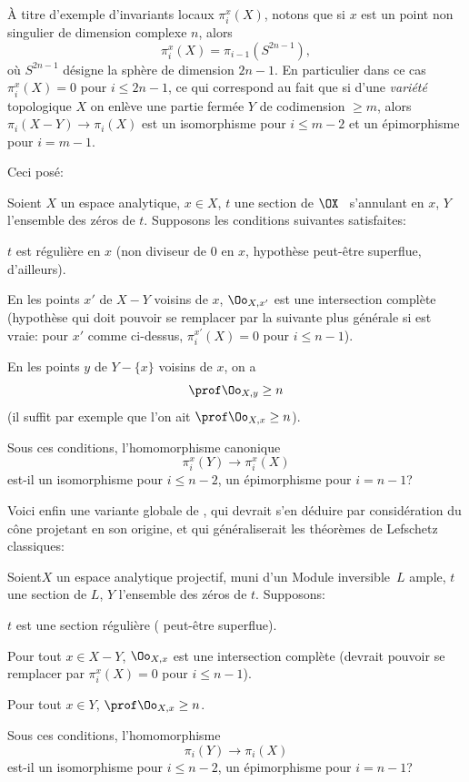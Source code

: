 À titre d'exemple d'invariants locaux $\pi_i^x(X)$, notons que si $x$ est un point non singulier de  dimension complexe $n$, alors\pageoriginale
$$
\pi_i^x(X)=\pi_{i-1}(S^{2n-1}),
$$
o\`u $S^{2n-1}$ d\'esigne la sph\`ere de dimension $2n-1$. En particulier dans ce cas $\pi_{i}^x(X)=0$ pour $i\le 2n-1$, ce qui correspond au fait que si d'une \emph{vari\'et\'e} topologique $X$ on enl\`eve une partie ferm\'ee $Y$ de codimension $\ge m$, alors $\pi_i(X-Y)\to \pi_i(X)$ est un isomorphisme pour $i\le m-2$ et un \'epimorphisme pour $i=m-1$.

Ceci pos\'e:

\begin{probleme} \label{XIII.4.2}
Soient $X$ un espace analytique, $x\in X$, $t$ une section de $\OX$ \ s'annulant en $x$, $Y$ l'ensemble des z\'eros de $t$. Supposons les conditions suivantes satisfaites:
\begin{enumeratea}
\item
$t$ est r\'eguli\`ere en $x$ (\ie non diviseur de $0$ en $x$, hypoth\`ese peut-\^etre superflue, d'ailleurs).
\item
En les points $x'$ de $X-Y$ voisins de $x$, $\Oo_{X, x'}$ est une intersection compl\`ete (hypoth\`ese qui doit pouvoir se remplacer par la suivante plus g\'en\'erale si  est vraie: pour $x'$ comme ci-dessus, $\pi_i^{x'}(X)=0$ pour $i\le n-1$).
\item
En les points $y$ de $Y-\{ x\}$ voisins de $x$, on a
$$
\prof \Oo_{X, y}\ge n$$
(il suffit par exemple que l'on ait $\prof\Oo_{X, x}\ge n$).
\end{enumeratea}

Sous ces conditions, l'homomorphisme canonique
$$
\pi_i^x(Y)\to \pi_i^x(X)$$
est-il un isomorphisme pour $i\le n-2$, un \'epimorphisme pour $i=n-1$?
\end{probleme}

Voici enfin une variante globale de , qui devrait s'en d\'eduire par consid\'eration du c\^{o}ne projetant en son origine, et qui g\'en\'eraliserait les th\'eor\`emes de Lefschetz classiques:

\begin{probleme} \label{XIII.4.3}
Soient\pageoriginale $X$ un espace analytique projectif, muni d'un Module inversible~$L$ ample, $t$ une section de $L$, $Y$ l'ensemble des z\'eros de $t$. Supposons:
\begin{enumeratea}
\item
$t$ est une section r\'eguli\`ere ( peut-\^etre superflue).
\item
Pour tout $x\in X-Y$, $\Oo_{X, x}$ est une intersection compl\`ete (devrait pouvoir se remplacer par $\pi_i^{x}(X)=0$ pour $i\le n-1$).
\item
Pour tout $x\in Y$, $\prof \Oo_{X, x}\ge n$.
\end{enumeratea}

Sous ces conditions, l'homomorphisme
$$
\pi_i(Y)\to \pi_i(X)$$
est-il un isomorphisme pour $i\le n-2$, un \'epimorphisme pour $i=n-1$?
\end{probleme}

